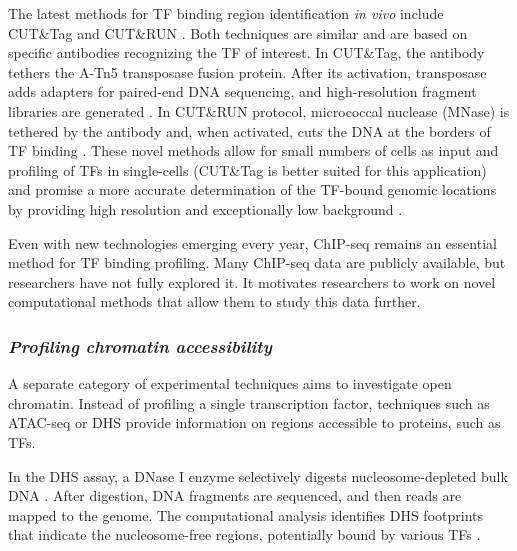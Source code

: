       The latest methods for TF binding region identification \textit{in vivo} include CUT\&Tag and CUT\&RUN \cite{kaya2019cut}. Both techniques are similar and are based on specific antibodies recognizing the TF of interest. In CUT\&Tag, the antibody tethers the A-Tn5 transposase fusion protein. After its activation, transposase adds adapters for paired-end DNA sequencing, and high-resolution fragment libraries are generated \cite{kaya2019cut,kaya2020efficient}. In CUT\&RUN protocol, micrococcal nuclease (MNase) is tethered by the antibody and, when activated, cuts the DNA at the borders of TF binding \cite{skene2017efficient}. These novel methods allow for small numbers of cells as input and profiling of TFs in single-cells (CUT\&Tag is better suited for this application) and promise a more accurate determination of the TF-bound genomic locations by providing high resolution and exceptionally low background \cite{skene2017efficient,kaya2019cut,kaya2020efficient}.

      Even with new technologies emerging every year, ChIP-seq remains an essential method for TF binding profiling. Many ChIP-seq data are publicly available, but researchers have not fully explored it. It motivates researchers to work on novel computational methods that allow them to study this data further.

    \subsubsection{\textit{Profiling chromatin accessibility}}

    A separate category of experimental techniques aims to investigate open chromatin. Instead of profiling a single transcription factor, techniques such as \ac{ATAC-seq} or \ac{DHS} provide information on regions accessible to proteins, such as TFs.

    In the DHS assay, a DNase I enzyme selectively digests nucleosome-depleted bulk DNA \cite{song2010dnase}. After digestion, DNA fragments are sequenced, and then reads are mapped to the genome. The computational analysis identifies DHS footprints that indicate the nucleosome-free regions, potentially bound by various TFs \cite{song2010dnase,thurman2012accessible}.

